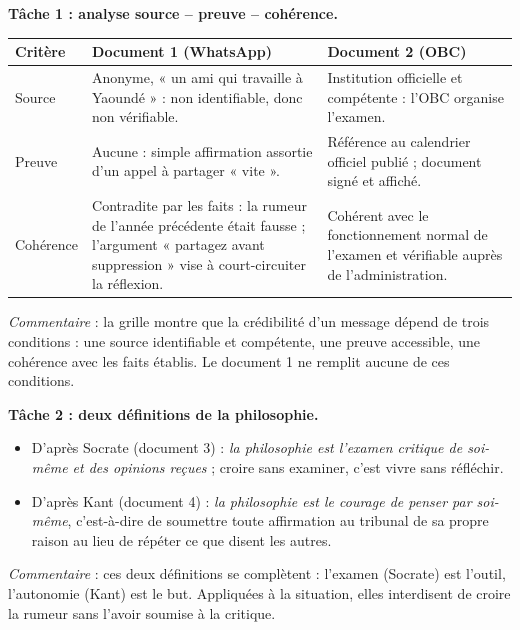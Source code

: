 \documentclass[11pt]{article}
\begin{document}
\begin{exoresolu}
\textbf{Tâche 1 : analyse source -- preuve -- cohérence.}

\begin{center}
\begin{tabularx}{\linewidth}{|l|X|X|}
\hline
\rowcolor{popblueL} \textbf{Critère} & \textbf{Document 1 (WhatsApp)} & \textbf{Document 2 (OBC)} \\
\hline
Source & Anonyme, « un ami qui travaille à Yaoundé » : non identifiable, donc non vérifiable. & Institution officielle et compétente : l'OBC organise l'examen. \\
\hline
Preuve & Aucune : simple affirmation assortie d'un appel à partager « vite ». & Référence au calendrier officiel publié ; document signé et affiché. \\
\hline
Cohérence & Contradite par les faits : la rumeur de l'année précédente était fausse ; l'argument « partagez avant suppression » vise à court-circuiter la réflexion. & Cohérent avec le fonctionnement normal de l'examen et vérifiable auprès de l'administration. \\
\hline
\end{tabularx}
\end{center}

\emph{Commentaire} : la grille montre que la crédibilité d'un message dépend de trois conditions : une source identifiable et compétente, une preuve accessible, une cohérence avec les faits établis. Le document 1 ne remplit aucune de ces conditions.

\tcblower

\textbf{Tâche 2 : deux définitions de la philosophie.}

\begin{itemize}
\item D'après Socrate (document 3) : \emph{la philosophie est l'examen critique de soi-même et des opinions reçues} ; croire sans examiner, c'est vivre sans réfléchir.
\item D'après Kant (document 4) : \emph{la philosophie est le courage de penser par soi-même}, c'est-à-dire de soumettre toute affirmation au tribunal de sa propre raison au lieu de répéter ce que disent les autres.
\end{itemize}

\emph{Commentaire} : ces deux définitions se complètent : l'examen (Socrate) est l'outil, l'autonomie (Kant) est le but. Appliquées à la situation, elles interdisent de croire la rumeur sans l'avoir soumise à la critique.


\end{exoresolu}
\end{document}
